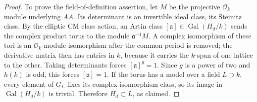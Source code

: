 \begin{proof}
To prove the field-of-definition assertion, let $M$ be the
projective $\mathcal O_k$ module underlying $AA$.
Its determinant is an invertible ideal class, its Steinitz class.
By the elliptic CM class action, an Artin class
$[\mathfrak a]\in\operatorname{Gal}(H_d/k)$ sends the
complex product torus to the module $\mathfrak a^{-1}M$.
A complex isomorphism of these tori is an
$\mathcal O_k$-module isomorphism after the common period
is removed; the derivative matrix then has entries in $k$,
because it carries the $k$-span of one lattice to the other.
Taking determinants forces
$[\mathfrak a]^g=1$.
Since $g$ is a power of two and $h(k)$ is odd, this forces
$[\mathfrak a]=1$.
If the torus has a model over a field $L\supset k$,
every element of $G_L$ fixes its complex isomorphism class,
so its image in $\operatorname{Gal}(H_d/k)$ is trivial.
Therefore $H_d\subset L$, as claimed.
\end{proof}


